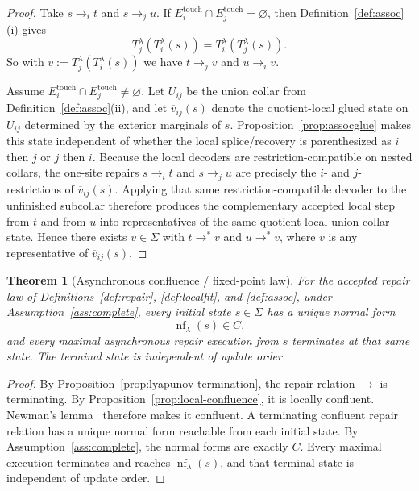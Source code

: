 \documentclass[11pt]{article}
\newtheorem{theorem}{Theorem}[section]
\theoremstyle{remark}
\theoremstyle{plain}
\begin{document}
\begin{proof}
Take \(s\to_i t\) and \(s\to_j u\).
If \(E_i^{\mathrm{touch}}\cap E_j^{\mathrm{touch}}=\varnothing\), then
Definition~\ref{def:assoc}(i) gives
\[
T_j^\lambda(T_i^\lambda(s))=T_i^\lambda(T_j^\lambda(s)).
\]
So with \(v:=T_j^\lambda(T_i^\lambda(s))\) we have \(t\to_j v\) and \(u\to_i v\).

Assume \(E_i^{\mathrm{touch}}\cap E_j^{\mathrm{touch}}\neq\varnothing\). Let \(U_{ij}\) be the
union collar from Definition~\ref{def:assoc}(ii), and let \(\overline v_{ij}(s)\) denote the
quotient-local glued state on \(U_{ij}\) determined by the exterior marginals of \(s\).
Proposition~\ref{prop:assocglue} makes this state independent of whether the local
splice/recovery is parenthesized as \(i\) then \(j\) or \(j\) then \(i\). Because the local
decoders are restriction-compatible on nested collars, the one-site repairs \(s\to_i t\) and
\(s\to_j u\) are precisely the \(i\)- and \(j\)-restrictions of \(\overline v_{ij}(s)\).
Applying that same restriction-compatible decoder to the unfinished subcollar therefore produces
the complementary accepted local step from \(t\) and from \(u\) into representatives of the same
quotient-local union-collar state. Hence there exists \(v\in\Sigma\) with \(t\to^* v\) and
\(u\to^* v\), where \(v\) is any representative of \(\overline v_{ij}(s)\).
\end{proof}

\begin{theorem}[Asynchronous confluence / fixed-point law]\label{thm:confluence}
For the accepted repair law of Definitions~\ref{def:repair}, \ref{def:localfit}, and
\ref{def:assoc}, under Assumption~\ref{ass:complete}, every initial state $s\in\Sigma$ has a unique normal form
\[
\operatorname{nf}_\lambda(s)\in C,
\]
and every maximal asynchronous repair execution from $s$ terminates at that same state. The terminal state is independent of update order.
\end{theorem}

\begin{proof}
By Proposition~\ref{prop:lyapunov-termination}, the repair relation \(\to\) is terminating.
By Proposition~\ref{prop:local-confluence}, it is locally confluent. Newman's
lemma~\cite{newman42} therefore makes it confluent. A terminating confluent repair relation has a
unique normal form reachable from each initial state. By Assumption~\ref{ass:complete}, the
normal forms are exactly \(C\). Every maximal execution terminates and reaches
\(\operatorname{nf}_\lambda(s)\), and that terminal state is independent of update order.
\end{proof}
\end{document}
